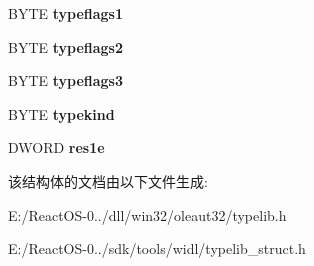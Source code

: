 \begin{DoxyCompactItemize}
\item 
\mbox{\label{struct_s_l_t_g___type_info_header_a8534e474e2b73fa06d64e59aef38ae66}} 
B\+Y\+TE {\bfseries typeflags1}
\item 
\mbox{\label{struct_s_l_t_g___type_info_header_acfce523f233ea91cf4f888d9be1717c5}} 
B\+Y\+TE {\bfseries typeflags2}
\item 
\mbox{\label{struct_s_l_t_g___type_info_header_a71485759526bb24c0f4456a116ffec45}} 
B\+Y\+TE {\bfseries typeflags3}
\item 
\mbox{\label{struct_s_l_t_g___type_info_header_a178fd4904262833d684fe30e3fc38fce}} 
B\+Y\+TE {\bfseries typekind}
\item 
\mbox{\label{struct_s_l_t_g___type_info_header_a07945ed12d0ed39d312ddea64d9a5e5c}} 
D\+W\+O\+RD {\bfseries res1e}
\end{DoxyCompactItemize}


该结构体的文档由以下文件生成\+:\begin{DoxyCompactItemize}
\item 
E\+:/\+React\+O\+S-\/0../dll/win32/oleaut32/typelib.\+h\item 
E\+:/\+React\+O\+S-\/0../sdk/tools/widl/typelib\+\_\+struct.\+h\end{DoxyCompactItemize}
